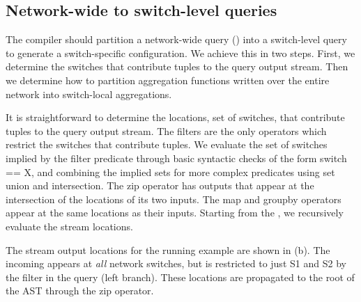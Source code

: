 \subsection{Network-wide to switch-level queries}
\label{sec:network-to-switch-local}


The compiler should partition a network-wide query () into a
switch-level query to generate a switch-specific configuration. We achieve this
in two steps. First, we determine the switches that contribute tuples to the
query output stream. Then we determine how to partition aggregation functions
written over the entire network into switch-local aggregations.

 It is straightforward to determine
the locations, \ie set of switches, that contribute tuples to the query output
stream. The {\ct filter}s are the only operators which restrict the switches
that contribute tuples. We evaluate the set of switches implied by the {\ct
  filter} predicate through basic syntactic checks of the form {\ct switch ==
  X}, and combining the implied sets for more complex predicates using set union
and intersection. The {\ct zip} operator has outputs that appear at the
intersection of the locations of its two inputs. The {\ct map} and {\ct groupby}
operators appear at the same locations as their inputs. Starting from the {\ct
  \pktlog}, we recursively evaluate the stream locations.

The stream output locations for the running example are shown in
(b). The incoming {\ct \pktlog} appears at {\em
  all} network switches, but is restricted to just {\ct S1} and {\ct S2} by the
filter in the query (left branch). These locations are propagated to the root of
the AST through the {\ct zip} operator.




